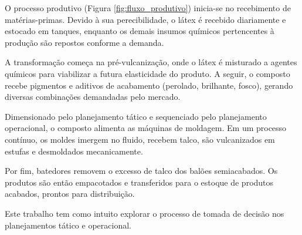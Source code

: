 \documentclass[fleqn,12pt,a4paper]{article}
\begin{document}
O processo produtivo (Figura \ref{fig:fluxo_produtivo}) inicia-se no recebimento de matérias-primas. Devido à sua perecibilidade, o látex é recebido diariamente e estocado em tanques, enquanto os demais insumos químicos pertencentes à produção são repostos conforme a demanda.

A transformação começa na pré-vulcanização, onde o látex é misturado a agentes químicos para viabilizar a futura elasticidade do produto. A seguir, o composto recebe pigmentos e aditivos de acabamento (perolado, brilhante, fosco), gerando diversas combinações demandadas pelo mercado.

Dimensionado pelo planejamento tático e sequenciado pelo planejamento operacional, o composto alimenta as máquinas de moldagem. Em um processo contínuo, os moldes imergem no fluido, recebem talco, são vulcanizados em estufas e desmoldados mecanicamente.

Por fim, batedores removem o excesso de talco dos balões semiacabados. Os produtos são então empacotados e transferidos para o estoque de produtos acabados, prontos para distribuição.

Este trabalho tem como intuito explorar o processo de tomada de decisão nos planejamentos tático e operacional.
\end{document}
